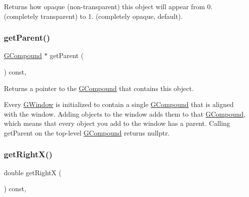 Returns how opaque (non-\/transparent) this object will appear from 0. (completely transparent) to 1. (completely opaque, default). 

\mbox{\label{classsgl_1_1GObject_a3e53cef70541b1a14eade4ad0984d0b4}} 
\subsubsection{\texorpdfstring{get\+Parent()}{getParent()}}
{\footnotesize\ttfamily \mbox{\hyperlink{classsgl_1_1GCompound}{G\+Compound}} $\ast$ get\+Parent (\begin{DoxyParamCaption}{ }\end{DoxyParamCaption}) const\hspace{0.3cm}{\ttfamily [virtual]}, {\ttfamily [inherited]}}



Returns a pointer to the {\ttfamily \mbox{\hyperlink{classsgl_1_1GCompound}{G\+Compound}}} that contains this object. 

Every {\ttfamily \mbox{\hyperlink{classsgl_1_1GWindow}{G\+Window}}} is initialized to contain a single {\ttfamily \mbox{\hyperlink{classsgl_1_1GCompound}{G\+Compound}}} that is aligned with the window. Adding objects to the window adds them to that {\ttfamily \mbox{\hyperlink{classsgl_1_1GCompound}{G\+Compound}}}, which means that every object you add to the window has a parent. Calling {\ttfamily get\+Parent} on the top-\/level {\ttfamily \mbox{\hyperlink{classsgl_1_1GCompound}{G\+Compound}}} returns {\ttfamily nullptr}. \mbox{\label{classsgl_1_1GObject_a798cc79daaa10145b28f60bcdfdb0ee9}} 
\subsubsection{\texorpdfstring{get\+Right\+X()}{getRightX()}}
{\footnotesize\ttfamily double get\+RightX (\begin{DoxyParamCaption}{ }\end{DoxyParamCaption}) const\hspace{0.3cm}{\ttfamily [virtual]}, {\ttfamily [inherited]}}



